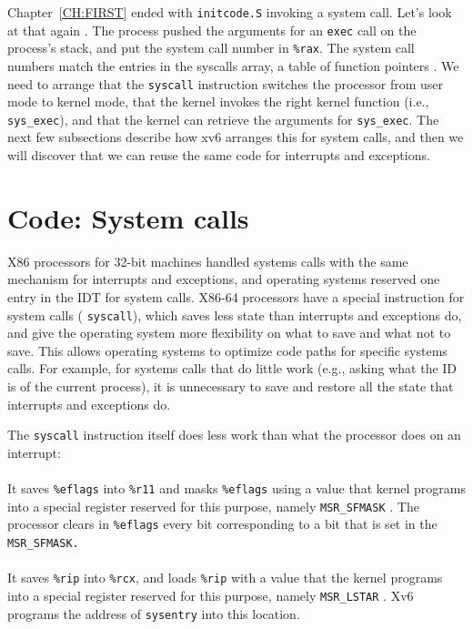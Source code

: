 {Chapter~\ref{CH:FIRST} ended with 
\lstinline{initcode.S}
invoking a system call.
Let's look at that again
.
The process pushed the arguments
for an 
\lstinline{exec}
call on the process's stack, and put the
system call number in
\texttt{\%rax}.
The system call numbers match the entries in the syscalls array,
a table of function pointers
.
We need to arrange that the 
\lstinline{syscall}
instruction switches the processor from user mode to kernel mode,
that the kernel invokes the right kernel function (i.e.,
\lstinline{sys_exec}),
and that the kernel can retrieve the arguments for
\lstinline{sys_exec}.
The next few subsections describe how xv6 arranges this for system
calls, and then we will discover that we can reuse the same code for
interrupts and exceptions.
\section{Code: System calls}

X86 processors for 32-bit machines handled systems calls with the same mechanism
for interrupts and exceptions, and operating systems reserved one entry in the IDT
for system calls.  X86-64 processors have a special instruction for system
calls (
\lstinline{syscall}),
which saves less state than interrupts and exceptions do, and give the operating
system more flexibility on what to save and what not to save.  This allows
operating systems to optimize code paths for specific systems calls.  For
example, for systems calls that do little work (e.g., asking what the ID is of
the current process), it is unnecessary to save and restore all the
state that interrupts and exceptions do. 

The
\lstinline{syscall}
instruction itself does less work than what the processor does on
an interrupt:
\paragraph{\textbullet}It saves
\texttt{\%eflags}
into
\texttt{\%r11}
and masks
\texttt{\%eflags}
using
a value that kernel programs into a special register reserved for this
purpose, namely
\lstinline{MSR_SFMASK}
.
The processor clears in
\texttt{\%eflags}
every bit corresponding to a bit that is set in the
\lstinline{MSR_SFMASK.}
\paragraph{\textbullet}It saves
\texttt{\%rip}
into
\texttt{\%rcx},
and loads
\texttt{\%rip}
with a value that the kernel programs into a special register reserved
for this purpose, namely
\lstinline{MSR_LSTAR}
.
Xv6 programs the address of
\lstinline{sysentry}
into this location.
}
